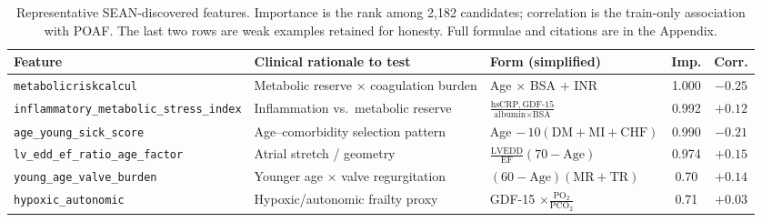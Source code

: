\documentclass[11pt]{article}
\newcommand{\sean}{SEAN}
\begin{document}
\begin{table}[t]
\centering
\begin{threeparttable}
\caption{Representative \sean{}-discovered features. Importance is the rank among 2{,}182
candidates; correlation is the train-only association with POAF. The last two rows are weak
examples retained for honesty. Full formulae and citations are in the Appendix.}
\label{tab:features}
\footnotesize
\setlength{\tabcolsep}{4pt}
\begin{tabular}{p{}p{}p{}cc}
\toprule
Feature & Clinical rationale to test & Form (simplified) & Imp. & Corr. \\
\midrule
\texttt{metabolicriskcalcul} & Metabolic reserve $\times$ coagulation burden & Age $\times$ BSA $+$ INR & 1.000 & $-0.25$ \\
\texttt{inflammatory\_\allowbreak metabolic\_\allowbreak stress\_\allowbreak index} & Inflammation vs.\ metabolic reserve & $\frac{\text{hsCRP},\,\text{GDF-15}}{\text{albumin}\times\text{BSA}}$ & 0.992 & $+0.12$ \\
\texttt{age\_\allowbreak young\_\allowbreak sick\_\allowbreak score} & Age--comorbidity selection pattern & Age $-\,10(\mathrm{DM{+}MI{+}CHF})$ & 0.990 & $-0.21$ \\
\texttt{lv\_\allowbreak edd\_\allowbreak ef\_\allowbreak ratio\_\allowbreak age\_\allowbreak factor} & Atrial stretch / geometry & $\frac{\text{LVEDD}}{\text{EF}}(70-\mathrm{Age})$ & 0.974 & $+0.15$ \\
\texttt{young\_\allowbreak age\_\allowbreak valve\_\allowbreak burden} & Younger age $\times$ valve regurgitation & $(60{-}\mathrm{Age})(\text{MR}{+}\text{TR})$ & 0.70 & $+0.14$ \\
\texttt{hypoxic\_\allowbreak autonomic} & Hypoxic/autonomic frailty proxy & GDF-15 $\times \frac{\text{PO}_2}{\text{PCO}_2}$ & 0.71 & $+0.03$ \\
\bottomrule
\end{tabular}
\end{threeparttable}
\end{table}
\end{document}

